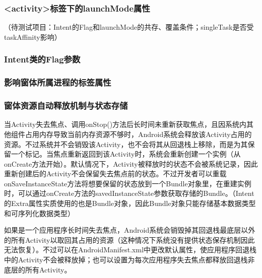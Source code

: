 \documentclass[UTF8]{ctexart}
\begin{document}
        \subsubsection{<activity>标签下的launchMode属性}
        （待测试项目：Intent的Flag和launchMode的共存、覆盖条件；singleTask是否受taskAffinity影响）
        \subsubsection{Intent类的Flag参数}
        \subsubsection{影响窗体所属进程的标签属性}
        \subsubsection{窗体资源自动释放机制与状态存储}
        当Activity失去焦点、调用onStop()方法后长时间未重新获取焦点，且因系统内其他组件占用内存导致当前内存资源不够时，Android系统会释放该Activity占用的资源。不过系统并不会销毁该Activity，也不会将其从回退栈上移除，而是为其保留一个标记。当焦点重新返回到该Activity时，系统会重新创建一个实例（从onCreate方法开始）。默认情况下，Activity被释放时的状态不会被系统记录，因此重新创建后的Activity不会保留失去焦点前的状态。不过开发者可以重载onSaveInstanceState方法将想要保留的状态放到一个Bundle对象里，在重建实例时，可以通过onCreate方法的savedInstanceState参数获取存储的Bundle。（Intent的Extra属性实质使用的也是Bundle对象，因此Bundle对象只能存储基本数据类型和可序列化数据类型）

        如果是一个应用程序长时间失去焦点，Android系统会销毁掉其回退栈最底层以外的所有Activity以取回其占用的资源（这种情况下系统没有提供状态保存机制因此无法恢复）。不过可以在AndroidManifest.xml中更改默认属性，使应用程序回退栈中的Activity不会被释放掉；也可以设置为每次应用程序失去焦点都释放回退栈非底层的所有Activity。
\end{document}
